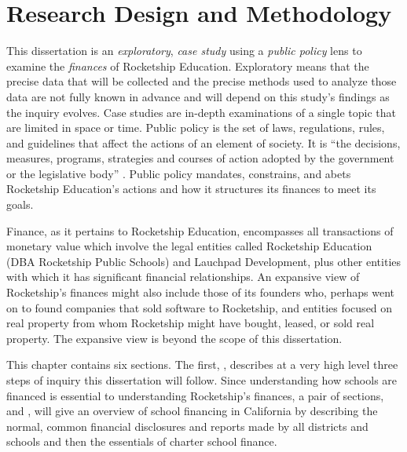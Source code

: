 
\chapter{Research Design and Methodology}\label{ch:methods}\indent

This dissertation is an \textit{exploratory}, \textit{case study} using a \textit{public policy} lens to examine the \textit{finances} of Rocketship Education. Exploratory means that the precise data that will be collected and the precise methods used to analyze those data are not fully known in advance and will depend on this study's findings as the inquiry evolves. Case studies are in-depth examinations of a single topic that are limited in space or time. Public policy is the set of laws, regulations, rules, and guidelines that affect the actions of an element of society. It is ``the decisions, measures, programs, strategies and courses of action adopted by the government or the legislative body'' \parencite[3]{Knill.Tosun2020}. Public policy mandates, constrains, and abets Rocketship Education's actions and how it structures its finances to meet its goals.

Finance, as it pertains to Rocketship Education, encompasses all transactions of monetary value which involve the legal entities called Rocketship Education (DBA Rocketship Public Schools) and Lauchpad Development, plus other entities with which it has significant financial relationships. An expansive view of Rocketship's finances might also include those of its founders who, perhaps went on to found companies that sold software to Rocketship, and entities focused on real property from whom Rocketship might have bought, leased, or sold real property. The expansive view is beyond the scope of this dissertation.

This chapter contains six sections. The first, , describes at a very high level three steps of inquiry this dissertation will follow. Since understanding how schools are financed is essential to understanding Rocketship's finances, a pair of sections,  and , will give an overview of school financing in California by describing the normal, common financial disclosures and reports made by all districts and schools and then the essentials of charter school finance. 

